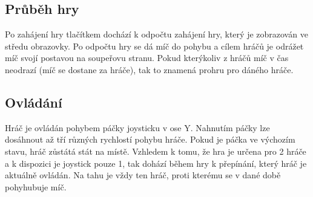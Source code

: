 \documentclass[a4paper, 11pt]{article}
\begin{document}
\subsection{Průběh hry}
Po zahájení hry tlačítkem dochází k odpočtu zahájení hry, který je zobrazován ve středu obrazovky. Po odpočtu hry se dá míč do pohybu a cílem hráčů je
odrážet míč svojí postavou na soupeřovu stranu. Pokud kterýkoliv z hráčů míč v čas neodrazí (míč se dostane za hráče), tak to znamená prohru pro dáného hráče.

\subsection{Ovládání}
Hráč je ovládán pohybem páčky joysticku v ose Y. Nahnutím páčky lze dosáhnout až tří různých rychlostí pohybu hráče. Pokud je páčka ve výchozím stavu, hráč
zůstátá stát na místě. Vzhledem k tomu, že hra je určena pro 2 hráče a k dispozici je joystick pouze 1, tak dohází během hry k přepínání, který hráč je aktuálně
ovládán. Na tahu je vždy ten hráč, proti kterému se v dané době pohyhubuje míč.

\newpage



\renewcommand{\refname}{Literatura}

\end{document}
